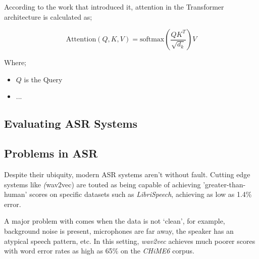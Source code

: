 According to the work that introduced it\cite{vaswani2017attention}, attention in the Transformer architecture is calculated as;

\[ \text{Attention}(Q,K,V) = \text{softmax}(\frac{QK^T}{\sqrt{d_k}})V \]

Where;

\begin{itemize}
        \item $Q$ is the Query
        \item ...
\end{itemize}



\subsection{Evaluating ASR Systems}

\subsection{Problems in ASR}

Despite their ubiquity, modern ASR systems aren't without fault.
Cutting edge systems like \emph(wav2vec) are touted as being capable of achieving 'greater-than-human' scores on specific datasets\cite{wav2vec2,bigssl,chung2021} such as \emph{LibriSpeech}\cite{librispeech}, achieving as low as 1.4\% error\cite{zhang2020}.

A major problem with comes when the data is not `clean', for example, background noise is present, microphones are far away, the speaker has an atypical speech pattern, etc. 
In this setting, \emph{wav2vec} achieves much poorer scores with word error rates as high as 65\%\cite{whisper} on the \emph{CHiME6} corpus\cite{chime6}.


